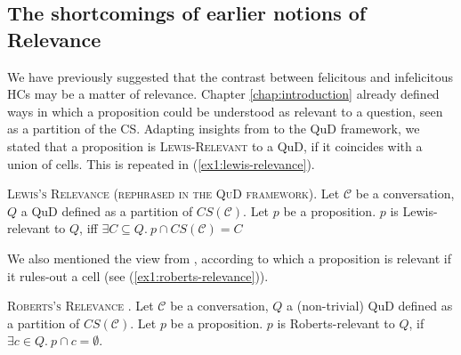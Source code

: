 \subsection{The shortcomings of earlier notions of Relevance}

We have previously suggested that the contrast between felicitous and infelicitous HCs may be a matter of relevance. Chapter \ref{chap:introduction} already defined ways in which a proposition could be understood as relevant to a question, seen as a partition of the CS. Adapting insights from \citet{Lewis1988} to the QuD framework, we stated that a proposition is \textsc{Lewis-Relevant} to a QuD, if it coincides with a union of cells. This is repeated in (\ref{ex1:lewis-relevance}). 

\begin{exe}
	 {\textsc{Lewis's Relevance (rephrased in the QuD framework).} Let $\mathcal{C}$ be a conversation, $Q$ a QuD defined as a partition of $CS(\mathcal{C})$. Let $p$ be a proposition. $p$ is Lewis-relevant to $Q$, iff $\exists C \subseteq Q. \ p \cap CS(\mathcal{C}) = C$}
\end{exe}

We also mentioned the view from \citet{Roberts2012}, according to which a proposition is relevant if it rules-out a cell (see (\ref{ex1:roberts-relevance})). 

\begin{exe}
	 {\textsc{Roberts's Relevance \citep{Roberts2012}.} Let $\mathcal{C}$ be a conversation, $Q$ a (non-trivial) QuD defined as a partition of $CS(\mathcal{C})$. Let $p$ be a proposition. $p$ is Roberts-relevant to $Q$, if $\exists c \in Q. \ p \cap c = \emptyset$.
	}
\end{exe}


